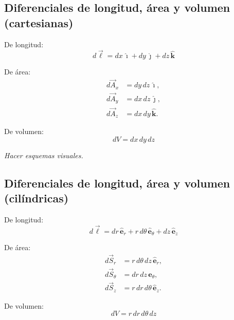 \documentclass[a4paper,12pt]{article}
\begin{document}
\newpage

\subsection{Diferenciales de longitud, área y volumen (cartesianas)}

De longitud:
\[
d\vec{\ell} = dx\,\hat{\imath} + dy\,\hat{\jmath} + dz\,\hat{\mathbf k}
\]

De área:
\[
\begin{aligned}
d\vec{A}_x &= dy\,dz\,\hat{\imath},\\
d\vec{A}_y &= dx\,dz\,\hat{\jmath},\\
d\vec{A}_z &= dx\,dy\,\hat{\mathbf k}.
\end{aligned}
\]

De volumen:
\[
dV = dx\,dy\,dz
\]

\textit{Hacer esquemas visuales.}


\subsection{Diferenciales de longitud, área y volumen (cilíndricas)}

De longitud:
\[
d\vec{\ell} = dr\,\hat{\mathbf e}_r + r\,d\theta\,\hat{\mathbf e}_\theta + dz\,\hat{\mathbf e}_z
\]

De área:
\[
\begin{aligned}
d\vec{S}_r      &= r\,d\theta\,dz\,\hat{\mathbf e}_r,\\
d\vec{S}_\theta &= dr\,dz\,\hat{\mathbf e}_\theta,\\
d\vec{S}_z      &= r\,dr\,d\theta\,\hat{\mathbf e}_z.
\end{aligned}
\]

De volumen:
\[
dV = r\,dr\,d\theta\,dz
\]

\begin{center}
\end{center}
\end{document}
